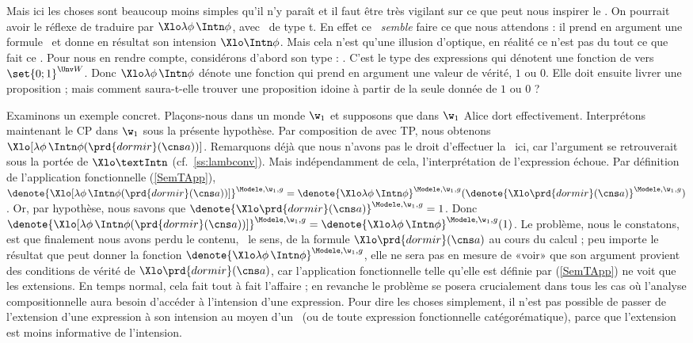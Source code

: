 Mais ici les choses sont beaucoup moins simples qu'il n'y paraît et il faut être très vigilant sur ce que peut nous inspirer le \lcalcul.  
On pourrait avoir le réflexe de traduire  par %
\(\Xlo\lambda \phi\, \Intn \phi\), avec \vrb\phi\ de type \typ t.
En effet ce \lterme\ \emph{semble} faire ce que nous attendons : il prend en argument une formule \vrb\phi\ et donne en résultat son intension $\Xlo\Intn\phi$. 
Mais cela n'est qu'une illusion d'optique, en réalité ce n'est pas du tout ce que fait ce \lterme. 
Pour nous en rendre compte, considérons d'abord son type : 
. 
C'est le type des expressions qui dénotent une fonction de  vers $\set{0;1}^{\Unv W}$.
Donc \(\Xlo\lambda \phi\, \Intn \phi\) dénote une fonction qui prend en argument une valeur de vérité, $1$ ou $0$.  Elle doit ensuite livrer une proposition ; mais comment saura-t-elle trouver une proposition idoine à partir de la seule donnée de $1$ ou $0$ ?

\sloppy

Examinons un exemple concret.  Plaçons-nous dans un monde $\w_1$ et supposons que dans $\w_1$ Alice dort effectivement. 
Interprétons maintenant le CP dans $\w_1$ sous la présente hypothèse. 
Par composition de  avec TP, nous obtenons \(\Xlo[\lambda \phi\, \Intn \phi(\prd{dormir}(\cns a))]\). 
Remarquons déjà que nous n'avons pas le droit d'effectuer la \breduc\ ici, car l'argument se retrouverait sous la portée de $\Xlo\textIntn$ (cf.~\ref{ss:lambconv}). 
Mais indépendamment de cela, l'interprétation de l'expression échoue.  Par définition de l'application fonctionnelle (\RSem\ref{SemTApp}),  %
\(\denote{\Xlo[\lambda \phi\, \Intn \phi(\prd{dormir}(\cns a))]}^{\Modele,\w_1,g} = \denote{\Xlo\lambda \phi\, \Intn \phi}^{\Modele,\w_1,g}(\denote{\Xlo\prd{dormir}(\cns a)}^{\Modele,\w_1,g})\). 
Or, par hypothèse, nous savons que \(\denote{\Xlo\prd{dormir}(\cns a)}^{\Modele,\w_1,g}=1\).  Donc
\(\denote{\Xlo[\lambda \phi\, \Intn \phi(\prd{dormir}(\cns a))]}^{\Modele,\w_1,g} = \denote{\Xlo\lambda \phi\, \Intn \phi}^{\Modele,\w_1,g}(1)\). 
Le problème, nous le constatons, est que finalement nous avons perdu le contenu, \ie\ le sens, de la formule $\Xlo\prd{dormir}(\cns a)$ au cours du calcul ; peu importe le résultat que peut donner la fonction \(\denote{\Xlo\lambda \phi\, \Intn \phi}^{\Modele,\w_1,g}\), elle ne sera pas en mesure de «voir»  que son argument provient des conditions de vérité de $\Xlo\prd{dormir}(\cns a)$, 
car l'application fonctionnelle telle qu'elle est définie par (\RSem\ref{SemTApp}) ne voit que les extensions. 
En temps normal, cela fait tout à fait l'affaire ; en revanche le problème se posera crucialement dans tous les cas où l'analyse compositionnelle aura besoin d'accéder à l'intension d'une expression.
Pour dire les choses simplement, il n'est pas possible de passer de l'extension d'une expression à son intension au moyen d'un \lterme\ (ou de toute expression fonctionnelle catégorématique), parce que l'extension est moins informative de l'intension.

